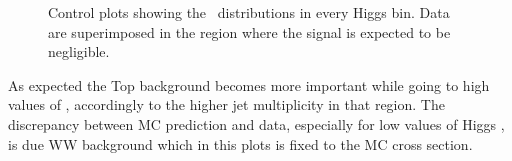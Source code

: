 \begin{figure}[htb]
\caption{Control plots showing the \mll~distributions in every Higgs \pt bin. Data are superimposed in the region where the signal is expected to be negligible.}\label{fig:control_plots}

\end{figure}

As expected the Top background becomes more important while going to high values of \pth, accordingly to the higher jet multiplicity in that region. The discrepancy between MC prediction and data, especially for low values of Higgs \pt, is due WW background which in this plots is fixed to the MC cross section.

